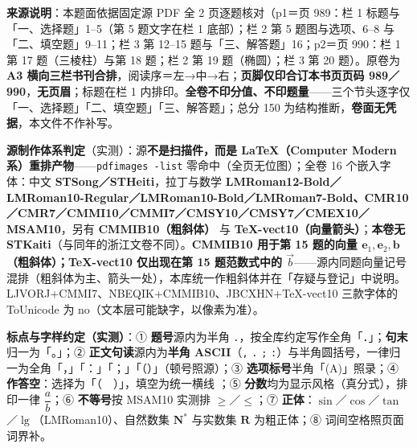 


\begin{gktip}
\textbf{来源说明}：本题面依据固定源 PDF 全 2 页逐题核对（p1＝页 989：栏 1 标题与「一、选择题」1–5（第 5 题文字在栏 1 底部）；栏 2 第 5 题图与选项、6–8 与「二、填空题」9–11；栏 3 第 12–15 题与「三、解答题」16；p2＝页 990：栏 1 第 17 题（三棱柱）与第 18 题；栏 2 第 19 题（椭圆）；栏 3 第 20 题）。原卷为 \textbf{A3 横向三栏书刊合排}，阅读序＝左→中→右；\textbf{页脚仅印合订本书页页码 989／990}，\textbf{无页眉}；标题在栏 1 内排印。\textbf{全卷不印分值、不印题量}——三个节头逐字仅「一、选择题」「二、填空题」「三、解答题」；总分 150 为结构推断，\textbf{卷面无凭据}，本文件不作补写。

\textbf{源制作体系判定}（实测）：源\textbf{不是扫描件，而是 LaTeX（Computer Modern 系）重排产物}——\texttt{pdfimages -list} 零命中（全页无位图）；全卷 16 个嵌入字体：中文 \textbf{STSong／STHeiti}，拉丁与数学 \textbf{LMRoman12-Bold／LMRoman10-Regular／LMRoman10-Bold／LMRoman7-Bold、CMR10／CMR7／CMMI10／CMMI7／CMSY10／CMSY7／CMEX10／MSAM10}，另有 \textbf{CMMIB10（粗斜体）} 与 \textbf{TeX-vect10（向量箭头）}；\textbf{本卷无 STKaiti}（与同年的浙江文卷不同）。\textbf{CMMIB10 用于第 15 题的向量 \(\boldsymbol{e}_1,\boldsymbol{e}_2,\boldsymbol{b}\)（粗斜体）；TeX-vect10 仅出现在第 15 题范数式中的 \(\vec b\)}——源内同题向量记号混排（粗斜体为主、箭头一处），本库统一作粗斜体并在「存疑与登记」中说明。LJVORJ+CMMI7、NBEQIK+CMMIB10、JBCXHN+TeX-vect10 三款字体的 ToUnicode 为 no（文本层可能缺字，以像素为准）。

\textbf{标点与字样约定（实测）}：① \textbf{题号}源内为半角 \texttt{.}，按全库约定写作全角「．」；\textbf{句末}归一为「。」；② \textbf{正文句读}源内为\textbf{半角 ASCII}（\texttt{,} \texttt{.} \texttt{;} \texttt{:}）与半角圆括号，一律归一为全角「，」「：」「；」「（）」（顿号照源）；③ \textbf{选项标号}半角「(A)」照录；④ \textbf{作答空}：选择为「（　）」，填空为统一横线 \texttt{\gkblank{}}；⑤ \textbf{分数}均为显示风格（真分式），排印一律 \(\dfrac{a}{b}\)；⑥ \textbf{不等号}按 MSAM10 实测排 \(\geqslant\)／\(\leqslant\)；⑦ \textbf{正体}：\(\sin\)／\(\cos\)／\(\tan\)／\(\lg\)（LMRoman10）、自然数集 \(\mathbf{N}^*\) 与实数集 \(\mathbf{R}\) 为粗正体；⑧ 词间空格照页面词界补。


\end{gktip}
